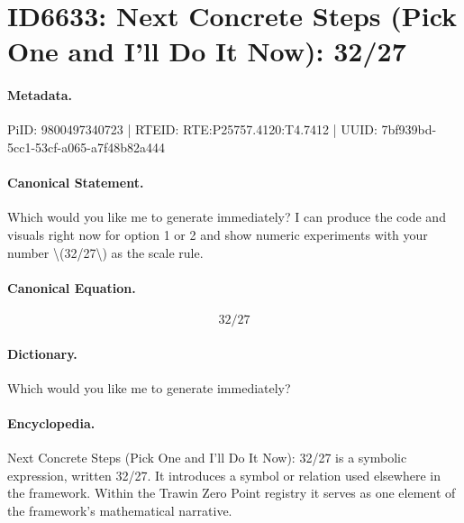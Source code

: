 \section*{ID6633: Next Concrete Steps (Pick One and I’ll Do It Now): 32/27}
\paragraph{Metadata.}
PiID: 9800497340723 | RTEID: RTE:P25757.4120:T4.7412 | UUID: 7bf939bd-5cc1-53cf-a065-a7f48b82a444

\paragraph{Canonical Statement.}
Which would you like me to generate immediately? I can produce the code and visuals right now for option 1 or 2 and show numeric experiments with your number \textbackslash{}(32/27\textbackslash{}) as the scale rule.

\paragraph{Canonical Equation.}
\[
32/27
\]

\paragraph{Dictionary.}
Which would you like me to generate immediately?

\paragraph{Encyclopedia.}
Next Concrete Steps (Pick One and I’ll Do It Now): 32/27 is a symbolic expression, written 32/27. It introduces a symbol or relation used elsewhere in the framework. Within the Trawin Zero Point registry it serves as one element of the framework's mathematical narrative.
